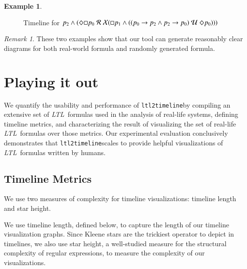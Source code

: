 \documentclass[preprint,12pt]{elsarticle}
\theoremstyle{definition}
\newtheorem{example}{Example}[section]
\theoremstyle{remark}
\newtheorem{remark}{Remark}[section]
\newcommand{\always}{\Box}
\newcommand{\eventually}{\Diamond}
\newcommand{\nextt}{\mathcal{X}}
\newcommand{\limplies}{\rightarrow}
\newcommand{\ltl}{\textit{LTL}}
\newcommand{\stronguntil}{\hspace{0.1cm} \mathcal{U}  \hspace{0.1cm}}
\newcommand{\weakrelease}{\hspace{0.1cm} \mathcal{R} \hspace{0.1cm}}
\newcommand{\tool}{\hspace{0.1cm}\texttt{ltl2timeline}\hspace{0.1cm}}
\begin{document}
\begin{example}
\begin{figure}[h!]
        \caption{Timeline for $p_2 \land (\eventually \always p_0 \weakrelease \nextt(\always p_1 \land ((p_0 \limplies p_2 \land p_2 \limplies p_0) \stronguntil \eventually p_0)))$}
        \label{fig:ex13}
    \end{figure}
\end{example}
\begin{remark}
    These two examples show that our tool can generate reasonably clear diagrams for both real-world formula and randomly generated formula.
\end{remark}

\section{Playing it out} \label{sec:playing}%

We quantify the usability and performance of \tool by compiling an extensive set of \ltl\ formulas used in the analysis of real-life systems, defining timeline metrics, and characterizing the result of visualizing the set of real-life \ltl\ formulas over those metrics.
Our experimental evaluation conclusively demonstrates that \tool scales to provide helpful visualizations of \ltl\ formulas written by humans.


\subsection{Timeline Metrics}
\label{sec:metrics}


We use two measures of complexity for timeline visualizations: timeline length and star height.

We use timeline length, defined below, to capture the length of our timeline visualization graphs. Since Kleene stars are the trickiest operator to depict in timelines, we also use star height, a well-studied measure for the structural complexity of regular expressions, to measure the complexity of our visualizations.
\end{document}

